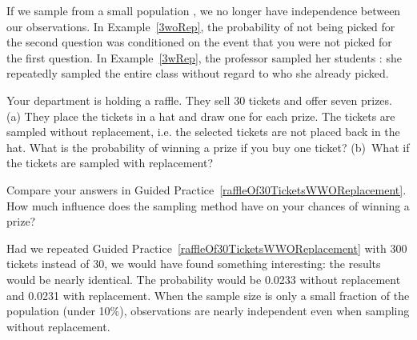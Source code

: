 If we sample from a small population , we no longer have independence between our observations. In Example~\ref{3woRep}, the probability of not being picked for the second question was conditioned on the event that you were not picked for the first question. In Example~\ref{3wRep}, the professor sampled her students : she repeatedly sampled the entire class without regard to who she already picked. 

\begin{exercisewrap}
\begin{nexercise} \label{raffleOf30TicketsWWOReplacement}
Your department is holding a raffle. They sell 30 tickets and offer seven prizes. (a) They place the tickets in a hat and draw one for each prize. The tickets are sampled without replacement, i.e. the selected tickets are not placed back in the hat. What is the probability of winning a prize if you buy one ticket? (b)~What if the tickets are sampled with replacement?\footnotemark
\end{nexercise}
\end{exercisewrap}

\begin{exercisewrap}
\begin{nexercise} \label{followUpToRaffleOf30TicketsWWOReplacement}
Compare your answers in Guided Practice~\ref{raffleOf30TicketsWWOReplacement}. How much influence does the sampling method have on your chances of winning a prize?\footnotemark
\end{nexercise}
\end{exercisewrap}

Had we repeated Guided Practice~\ref{raffleOf30TicketsWWOReplacement} with 300 tickets instead of 30, we would have found something interesting: the results would be nearly identical. The probability would be 0.0233 without replacement and 0.0231 with replacement. When the sample size is only a small fraction of the population (under 10\%), observations are nearly independent even when sampling without replacement.


{}





